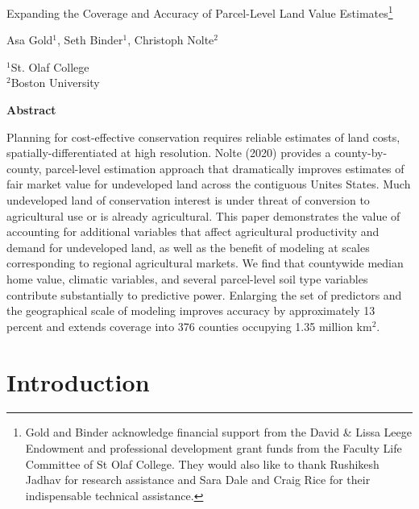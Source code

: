 \documentclass[12pt]{article}
\begin{document}
\hspace{5pt}

\Large
 \begin{center}
Expanding the Coverage and Accuracy of Parcel-Level Land Value Estimates\footnote[2]{Gold and Binder acknowledge financial support from the David \& Lissa Leege Endowment and professional development grant funds from the Faculty Life Committee of St Olaf College. They would also like to thank Rushikesh Jadhav for research assistance and Sara Dale and Craig Rice for their indispensable technical assistance.}\\ 

\vspace{10pt}

\large
Asa Gold$^1$, Seth Binder$^1$, Christoph Nolte$^2$ \\

\vspace{10pt}

\footnotesize  
$^{1}$St. Olaf College\\
$^2$Boston University

\vspace{40pt} 

    \normalsize
    \textbf{Abstract}
\end{center}

\small
Planning for cost-effective conservation requires reliable estimates of land costs, spatially-differentiated at high resolution. Nolte (2020) provides a county-by-county, parcel-level estimation approach that dramatically improves estimates of fair market value for undeveloped land across the contiguous Unites States. Much undeveloped land of conservation interest is under threat of conversion to agricultural use or is already agricultural. This paper demonstrates the value of accounting for additional variables that affect agricultural productivity and demand for undeveloped land, as well as the benefit of modeling at scales corresponding to regional agricultural markets. We find that countywide median home value, climatic variables, and several parcel-level soil type variables contribute substantially to predictive power. Enlarging the set of predictors and the geographical scale of modeling improves accuracy by approximately 13 percent and extends coverage into 376 counties occupying 1.35 million km$^2$.

\newpage

\section{Introduction}
\end{document}
